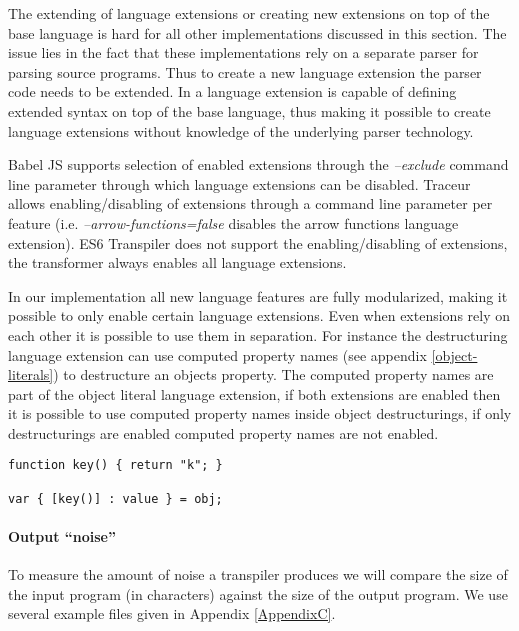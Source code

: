The extending of language extensions or creating new extensions on top of the base language is hard for all other implementations discussed in this section. The issue lies in the fact that these implementations rely on a separate parser for parsing source programs. Thus to create a new language extension the parser code needs to be extended. In \projectname a language extension is capable of defining extended syntax on top of the base language, thus making it possible to create language extensions without knowledge of the underlying parser technology.

Babel JS supports selection of enabled extensions through the \textit{--exclude} command line parameter through which language extensions can be disabled. Traceur allows enabling/disabling of extensions through a command line parameter per feature (i.e. \textit{--arrow-functions=false} disables the arrow functions language extension). ES6 Transpiler does not support the enabling/disabling of extensions, the transformer always enables all language extensions.

In our implementation all new language features are fully modularized, making it possible to only enable certain language extensions. Even when extensions rely on each other it is possible to use them in separation. For instance the destructuring language extension can use computed property names (see appendix \ref{object-literals}) to destructure an objects property. The computed property names are part of the object literal language extension, if both extensions are enabled then it is possible to use computed property names inside object destructurings, if only destructurings are enabled computed property names are not enabled.

\begin{lstlisting}[caption=Example of computed property names inside object destructurings]
function key() { return "k"; }

var { [key()] : value } = obj;
\end{lstlisting}

\paragraph{Output ``noise''}
To measure the amount of noise a transpiler produces we will compare the size of the input program (in characters) against the size of the output program. We use several example files given in Appendix \ref{AppendixC}.

